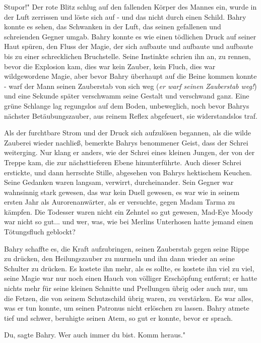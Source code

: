 \glqq{}Stupor!" Der rote Blitz schlug auf den fallenden Körper des Mannes ein,
wurde in der Luft zerrissen und löste sich auf - und das nicht durch einen
Schild. Bahry konnte es sehen, das Schwanken in der Luft, das seinen gefallenen
und schreienden Gegner umgab. Bahry konnte es wie einen tödlichen Druck auf
seiner Haut spüren, den Fluss der Magie, der sich aufbaute und aufbaute und
aufbaute bis zu einer schrecklichen Bruchstelle. Seine Instinkte schrien ihn an,
zu rennen, bevor die Explosion kam, dies war kein Zauber, kein Fluch, dies war
wildgewordene Magie, aber bevor Bahry überhaupt auf die Beine kommen konnte -
warf der Mann seinen Zauberstab von sich weg (\emph{er warf seinen Zauberstab
weg!}) und eine Sekunde später verschwamm seine Gestalt und verschwand ganz.
Eine grüne Schlange lag regungslos auf dem Boden, unbeweglich, noch bevor Bahrys
nächster Betäubungszauber, aus reinem Reflex abgefeuert, sie widerstandslos
traf.

Als der furchtbare Strom und der Druck sich aufzulösen begannen, als die wilde
Zauberei wieder nachließ, bemerkte Bahrys benommener Geist, dass der Schrei
weiterging. Nur klang er anders, wie der Schrei eines kleinen Jungen, der von
der Treppe kam, die zur nächsttieferen Ebene hinunterführte. Auch dieser Schrei
erstickte, und dann herrschte Stille, abgesehen von Bahrys hektischem Keuchen.
Seine Gedanken waren langsam, verwirrt, durcheinander. Sein Gegner war
wahnsinnig stark gewesen, das war kein Duell gewesen, es war wie in seinem
ersten Jahr als Aurorenanwärter, als er versuchte, gegen Madam Tarma zu kämpfen.
Die Todesser waren nicht ein Zehntel so gut gewesen, Mad-Eye Moody war nicht so
gut... und wer, was, wie bei Merlins Unterhosen hatte jemand einen Tötungsfluch
geblockt?

Bahry schaffte es, die Kraft aufzubringen, seinen Zauberstab gegen seine Rippe
zu drücken, den Heilungszauber zu murmeln und ihn dann wieder an seine Schulter
zu drücken. Es kostete ihn mehr, als es sollte, es kostete ihn viel zu viel,
seine Magie war nur noch einen Hauch von völliger Erschöpfung entfernt; er hatte
nichts mehr für seine kleinen Schnitte und Prellungen übrig oder auch nur, um
die Fetzen, die von seinem Schutzschild übrig waren, zu verstärken. Es war
alles, was er tun konnte, um seinen Patronus nicht erlöschen zu lassen. Bahry
atmete tief und schwer, beruhigte seinen Atem, so gut er konnte, bevor er
sprach.

\glqq{}Du\grqq{}, sagte Bahry. \glqq{}Wer auch immer du bist. Komm heraus."

